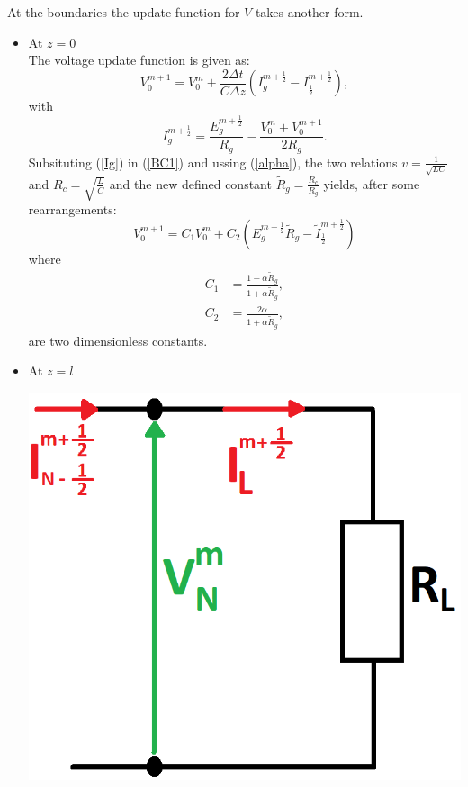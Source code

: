 \documentclass[dutch, a4paper, 11pt]{article}
\begin{document}
\begin{multicols}{2}
At the boundaries the update function for $V$ takes another form.
\begin{itemize}
    \item At $z = 0$\\
    The voltage update function is given as:
    \begin{equation}
        V^{m+1}_{0} = V^{m}_{0} + \frac{2\Delta t}{C\Delta z}\left(I^{m+\frac{1}{2}}_{g} - I^{m+\frac{1}{2}}_{\frac{1}{2}}\right),
        \label{BC1}
    \end{equation}
    with 
    \begin{equation}
        I^{m+\frac{1}{2}}_{g} = \frac{E^{m+\frac{1}{2}}_{g}}{R_{g}}-\frac{V^{m}_{0}+V^{m+1}_{0}}{2R_g}.
        \label{Ig}
    \end{equation}
    Subsituting (\ref{Ig}) in (\ref{BC1}) and ussing (\ref{alpha}), the two relations $v=\frac{1}{\sqrt{LC}}$ and $R_c=\sqrt{\frac{L}{C}}$ and the new defined constant $\tilde{R}_{g} = \frac{R_c}{R_g}$ yields, 
    after some rearrangements:
    \begin{equation}
        V^{m+1}_{0} = C_{1}V^{m}_{0} + C_{2}\left(E^{m+\frac{1}{2}}_{g}\tilde{R}_{g} - \tilde{I}^{m+\frac{1}{2}}_{\frac{1}{2}}\right)
    \end{equation}
    where
    \begin{align}
        C_{1} & = \frac{1-\alpha\tilde{R}_{g}}{1+\alpha\tilde{R}_{g}},\\
        C_{2} & = \frac{2\alpha}{1+\alpha\tilde{R}_{g}},
    \end{align}
    are two dimensionless constants.
    \item At $z = l$\\
    
    \begin{center}
    \includegraphics[scale=0.25]{BC2}
    \end{center}


\end{itemize}
\end{multicols}
\end{document}
